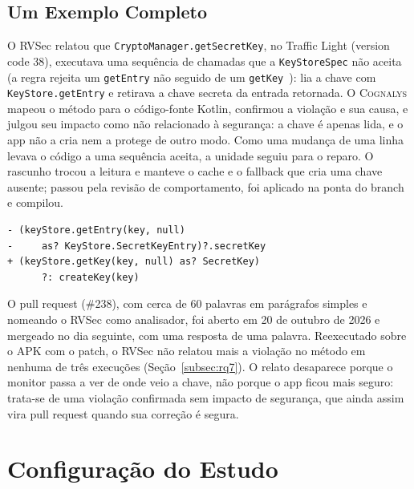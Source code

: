 \documentclass[conference]{IEEEtran}
\newcommand{\system}{\textsc{Cognalys}}
\begin{document}
\subsection{Um Exemplo Completo}

O RVSec relatou que \texttt{CryptoManager.getSecretKey}, no Traffic Light
(version code 38), executava uma sequência de chamadas que a
\texttt{KeyStoreSpec} não aceita (a regra rejeita um \texttt{getEntry} não seguido de
um \texttt{getKey}~\cite{costa2026effectiveness}): lia a chave com \texttt{KeyStore.getEntry} e
retirava a chave secreta da entrada retornada. O \system{} mapeou o método para
o código-fonte Kotlin, confirmou a violação e sua causa, e julgou seu impacto
como não relacionado à segurança: a chave é apenas lida, e o app não a cria nem
a protege de outro modo. Como uma mudança de uma linha levava o código a uma
sequência aceita, a unidade seguiu para o reparo. O rascunho trocou a leitura e
manteve o cache e o fallback que cria uma chave ausente; passou pela revisão de
comportamento, foi aplicado na ponta do branch e compilou.

{\scriptsize
\begin{verbatim}
- (keyStore.getEntry(key, null)
-     as? KeyStore.SecretKeyEntry)?.secretKey
+ (keyStore.getKey(key, null) as? SecretKey)
      ?: createKey(key)
\end{verbatim}}

O pull request (\#238), com cerca de 60 palavras em parágrafos simples e
nomeando o RVSec como analisador, foi aberto em 20 de outubro de 2026 e
mergeado no dia seguinte, com uma resposta de uma palavra. Reexecutado sobre o
APK com o patch, o RVSec não relatou mais a violação no método em nenhuma de
três execuções (Seção~\ref{subsec:rq7}). O relato desaparece porque o monitor
passa a ver de onde veio a chave, não porque o app ficou mais seguro: trata-se
de uma violação confirmada sem impacto de segurança, que ainda assim vira pull
request quando sua correção é segura.

\section{Configuração do Estudo}
\label{sec:settings}
\end{document}
